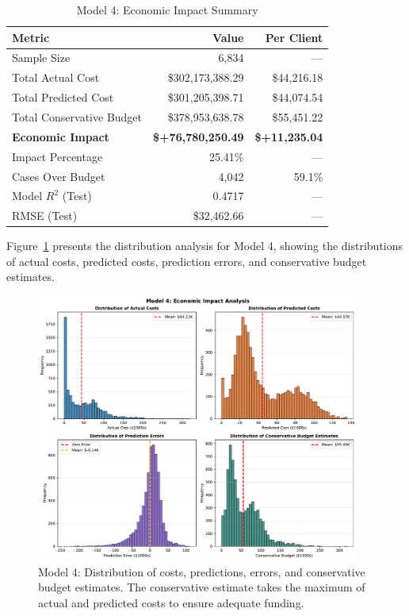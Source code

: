 \begin{table}[htbp]
\centering
\small
\caption{Model 4: Economic Impact Summary}
\label{tab:model4_impact_summary}
\begin{tabular}{lrr}
\toprule
\textbf{Metric} & \textbf{Value} & \textbf{Per Client} \\
\midrule
Sample Size & 6,834 & --- \\
\midrule
Total Actual Cost & \$302,173,388.29 & \$44,216.18 \\
Total Predicted Cost & \$301,205,398.71 & \$44,074.54 \\
Total Conservative Budget & \$378,953,638.78 & \$55,451.22 \\
\midrule
\textbf{Economic Impact} & \textbf{\$+76,780,250.49} & \textbf{\$+11,235.04} \\
Impact Percentage & 25.41\% & --- \\
\midrule
Cases Over Budget & 4,042 & 59.1\% \\
\midrule
Model $R^2$ (Test) & 0.4717 & --- \\
RMSE (Test) & \$32,462.66 & --- \\
\bottomrule
\end{tabular}
\end{table}

Figure~\ref{fig:model4_impact_histograms} presents the distribution analysis for Model 4, showing the distributions of actual costs, predicted costs, prediction errors, and conservative budget estimates.

\begin{figure}[htbp]
\centering
\includegraphics[width=0.95\textwidth]{figures/model_4_Impact_Histograms.pdf}
\caption{Model 4: Distribution of costs, predictions, errors, and conservative budget estimates. The conservative estimate takes the maximum of actual and predicted costs to ensure adequate funding.}
\label{fig:model4_impact_histograms}
\end{figure}

